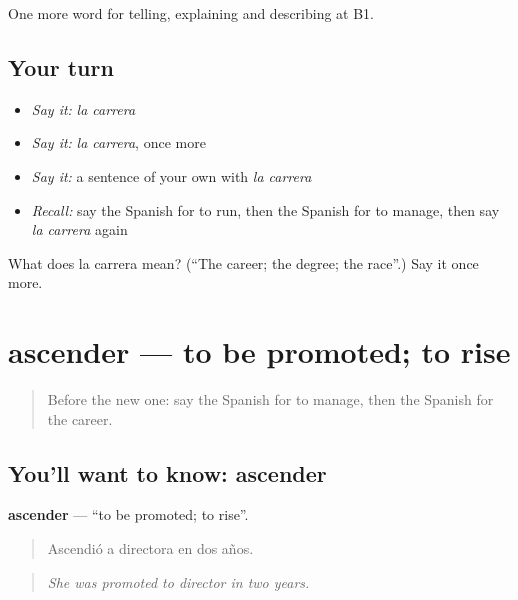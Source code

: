 \begin{grammarlens}[title={What you've built}]
One more word for telling, explaining and describing at B1.
\end{grammarlens}

\subsection*{Your turn}
\begin{itemize}
\raggedright
  \item \emph{Say it:} \emph{la carrera}
  \item \emph{Say it:} \emph{la carrera}, once more
  \item \emph{Say it:} a sentence of your own with \emph{la carrera}
  \item \emph{Recall:} say the Spanish for to run, then the Spanish for to manage, then say \emph{la carrera} again
\end{itemize}

\begin{tcolorbox}[breakable,colback=teal!4,colframe=teal!35!black,title={Before you move on}]
What does la carrera mean? (\textquotedblleft{}The career; the degree; the race\textquotedblright{}.) Say it once more.
\end{tcolorbox}
\section[ascender]{ascender — to be promoted; to rise}

\label{lesson:ES-C595-ascender}



\begin{quote}
Before the new one: say the Spanish for to manage, then the Spanish for the career.
\end{quote}

\subsection*{You'll want to know: ascender}
\textbf{ascender} — \textquotedblleft{}to be promoted; to rise\textquotedblright{}.

\begin{quote}
Ascendió a directora en dos años.
\end{quote}

\begin{quote}
\emph{She was promoted to director in two years.}
\end{quote}

